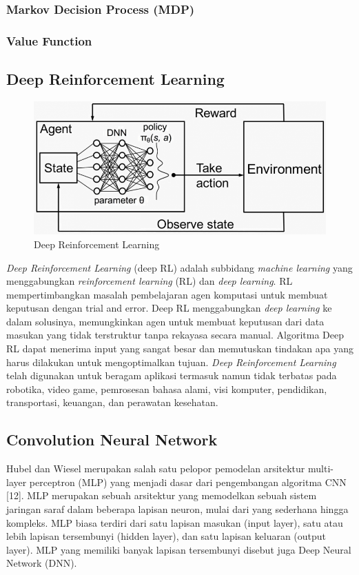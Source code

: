 \subsubsection{Markov Decision Process (MDP)}
\subsubsection{Value Function}
\fi
\subsection{Deep Reinforcement Learning}
\begin{figure}[H] 
	\centering
	\includegraphics[width=.4\linewidth]{images/deep_rl}
	\caption{Deep Reinforcement Learning}
	\label{fig:deep_reinforcement_learning}
\end{figure}
\textit{Deep Reinforcement Learning }(deep RL) adalah subbidang \textit{machine learning }yang menggabungkan \textit{reinforcement learning }(RL) dan \textit{deep learning}. RL mempertimbangkan masalah pembelajaran agen komputasi untuk membuat keputusan dengan trial and error. Deep RL menggabungkan \textit{deep learning }ke dalam solusinya, memungkinkan agen untuk membuat keputusan dari data masukan yang tidak terstruktur tanpa rekayasa secara manual. Algoritma Deep RL dapat menerima input yang sangat besar dan memutuskan tindakan apa yang harus dilakukan untuk mengoptimalkan tujuan. \textit{Deep Reinforcement Learning }telah digunakan untuk beragam aplikasi termasuk namun tidak terbatas pada robotika, video game, pemrosesan bahasa alami, visi komputer, pendidikan, transportasi, keuangan, dan perawatan kesehatan.\cite{cit:intro_to_deeprl}

\subsection{Convolution Neural Network}
Hubel dan Wiesel merupakan salah satu pelopor pemodelan arsitektur multi-layer perceptron (MLP) yang menjadi dasar dari pengembangan algoritma CNN [12]. MLP merupakan sebuah arsitektur yang memodelkan sebuah sistem jaringan saraf dalam beberapa lapisan neuron, mulai dari yang sederhana hingga kompleks. MLP biasa terdiri dari satu lapisan masukan (input layer), satu atau lebih lapisan tersembunyi (hidden layer), dan satu lapisan keluaran (output layer). MLP yang memiliki banyak lapisan tersembunyi disebut juga Deep Neural Network (DNN).


